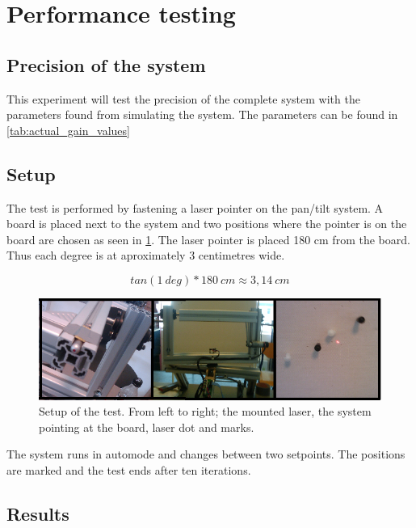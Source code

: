 \section{Performance testing}

\subsection{Precision of the system}\label{subsec:precisionofsystem}
This experiment will test the precision of the complete system with the
parameters found from simulating the system. The parameters can be found in
\ref{tab:actual_gain_values}

\subsection*{Setup}

The test is performed by fastening a laser pointer on the pan/tilt system. A
board is placed next to the system and two positions where the pointer is on the
board are chosen as seen in \ref{fig:systemtestsetup}. The laser pointer is placed 180 cm
from the board. Thus each degree is at aproximately 3 centimetres wide.

\[ tan(1 \ deg) * 180 \ cm \approx 3,14 \ cm \]


\begin{figure}[htb] \centering \includegraphics[width=\textwidth,trim=0 0 0
0]{graphics/overallsystemtest.png} %
	\caption{Setup of the test. From left to right; the mounted laser, the system pointing at the board, laser dot and marks.}
	\label{fig:systemtestsetup}			%
\end{figure}

The system runs in automode and changes between two setpoints. The positions
are marked and the test ends after ten iterations. 

\subsection*{Results}

